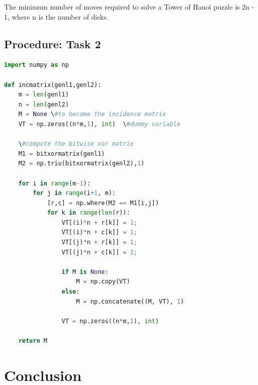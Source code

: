 ﻿\documentclass[11pt]{article}            %
\begin{document}
\begin{figure}
\centering


\label{Figure:3}    
\end{figure}
The minimum number of moves required to solve a Tower of Hanoi puzzle is 2n - 1, where n is the number of disks.

\subsection{Procedure: Task 2 }     

\begin{lstlisting}[language=Python]
import numpy as np
 
def incmatrix(genl1,genl2):
    m = len(genl1)
    n = len(genl2)
    M = None \#to become the incidence matrix
    VT = np.zeros((n*m,1), int)  \#dummy variable
 
    \#compute the bitwise xor matrix
    M1 = bitxormatrix(genl1)
    M2 = np.triu(bitxormatrix(genl2),1) 
 
    for i in range(m-1):
        for j in range(i+1, m):
            [r,c] = np.where(M2 == M1[i,j])
            for k in range(len(r)):
                VT[(i)*n + r[k]] = 1;
                VT[(i)*n + c[k]] = 1;
                VT[(j)*n + r[k]] = 1;
                VT[(j)*n + c[k]] = 1;
 
                if M is None:
                    M = np.copy(VT)
                else:
                    M = np.concatenate((M, VT), 1)
 
                VT = np.zeros((n*m,1), int)
 
    return M
\end{lstlisting}

\section{Conclusion}  


 
\end{document}
